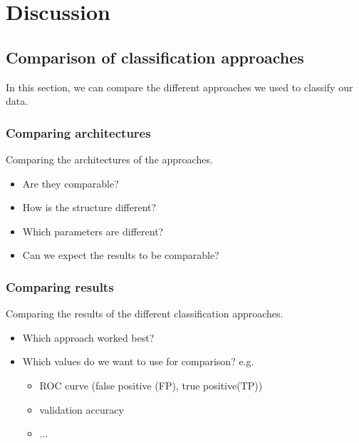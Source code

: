 \section{Discussion}

\subsection{Comparison of classification approaches}

In this section, we can compare the different approaches we used to classify our data.


\subsubsection{Comparing architectures}

Comparing the architectures of the approaches.

\begin{itemize}
\item Are they comparable?
\item How is the structure different?
\item Which parameters are different?
\item Can we expect the results to be comparable?
\end{itemize}


\subsubsection{Comparing results}

Comparing the results of the different classification approaches.

\begin{itemize}
\item Which approach worked best?
\item Which values do we want to use for comparison? e.g.

\begin{itemize}
\item ROC curve (false positive (FP), true positive(TP)) 
\item validation accuracy
\item ...
\end{itemize}

\end{itemize}


